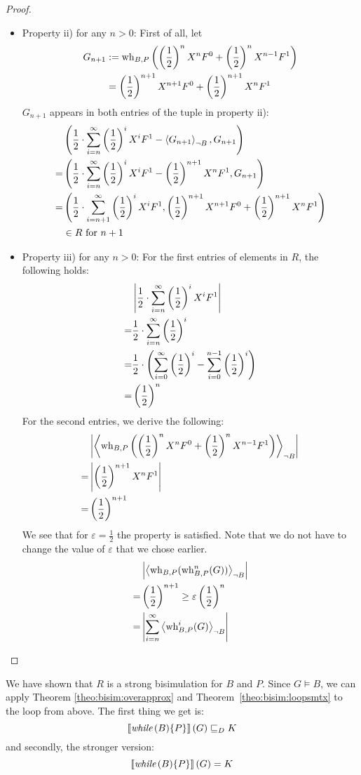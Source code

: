 \begin{proof}
\begin{itemize}
		\item Property ii) for any $n > 0$:
			First of all, let
			\begin{align*}
				G_{n+1} &:= \operatorname{wh}_{B, P}\left( \left( \frac{1}{2} \right)^n X^n F^0 + \left( \frac{1}{2} \right)^n X^{n-1} F^1 \right) \\
				&= \left( \frac{1}{2} \right)^{n+1} X^{n+1} F^0 + \left( \frac{1}{2} \right)^{n+1} X^n F^1
			\end{align*}
			$G_{n+1}$ appears in both entries of the tuple in property ii):
			\begin{align*}
				 & \left(  \frac{1}{2} \cdot \sum_{i=n}^{\infty} \left( \frac{1}{2} \right)^i X^i F^1
				  	- \left\langle  G_{n+1}  \right\rangle_{\lnot B} , G_{n+1}  \right) \\
				=& \left(  \frac{1}{2} \cdot \sum_{i=n}^{\infty} \left( \frac{1}{2} \right)^i X^i F^1
				 	- \left( \frac{1}{2} \right)^{n+1} X^n F^1 , G_{n+1}  \right) \\
				=& \left(  \frac{1}{2} \cdot \sum_{i=n+1}^{\infty} \left( \frac{1}{2} \right)^i X^i F^1,
					\left( \frac{1}{2} \right)^{n+1} X^{n+1} F^0 + \left( \frac{1}{2} \right)^{n+1} X^n F^1  \right) \\
				 & \in R \text{ for } n + 1
			\end{align*}
		
		\item Property iii) for any $n > 0$:
			For the first entries of elements in $R$, the following holds:
			\begin{align*}
				& \left| \frac{1}{2} \cdot \sum_{i=n}^{\infty} \left( \frac{1}{2} \right)^i X^i F^1 \right| \\
				=& \frac{1}{2} \cdot \sum_{i=n}^{\infty} \left( \frac{1}{2} \right)^i \\
				=& \frac{1}{2} \cdot \left( \sum_{i=0}^{\infty} \left( \frac{1}{2} \right)^i
					- \sum_{i=0}^{n-1} \left( \frac{1}{2} \right)^i \right) \\
				=& \left( \frac{1}{2} \right)^n
			\end{align*}
			For the second entries, we derive the following:
			\begin{align*}
				& \left| \left\langle  \operatorname{wh}_{B, P}\left( \left( \frac{1}{2} \right)^n X^n F^0 + \left( \frac{1}{2} \right)^n X^{n-1} F^1 \right)  \right\rangle_{\lnot B} \right| \\
				=& \left| \left( \frac{1}{2} \right)^{n+1} X^n F^1 \right| \\
				=& \left( \frac{1}{2} \right)^{n+1}
			\end{align*}
			We see that for $\varepsilon = \frac{1}{2}$ the property is satisfied.
			Note that we do not have to change the value of $\varepsilon$ that we chose earlier.
			\begin{align*}
				& \left| \left\langle \operatorname{wh}_{B, P}(\operatorname{wh}_{B, P}^n(G)) \right\rangle_{\lnot B} \right| \\
				=& \left( \frac{1}{2} \right)^{n+1} \geq \varepsilon \left( \frac{1}{2} \right)^n \\
				=& \left| \sum_{i=n}^\infty \left\langle \operatorname{wh}_{B, P}^i(G) \right\rangle_{\lnot B} \right|		\qedhere
			\end{align*}
	\end{itemize}
\end{proof}
We have shown that $R$ is a strong bisimulation for $B$ and $P$.
Since $G \models B$, we can apply Theorem \ref{theo:bisim:overapprox} and Theorem~\ref{theo:bisim:loopsmtx} to the loop from above.
The first thing we get is:
\[ \left\llbracket \textit{while}\,(B) \{P\} \right\rrbracket(G) \sqsubseteq_{D} K \]
and secondly, the stronger version:
\[ \left\llbracket \textit{while}\,(B) \{P\} \right\rrbracket(G) = K \]
